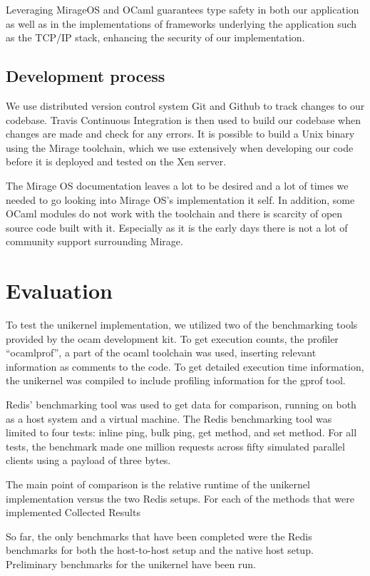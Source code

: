 \documentclass[english,10pt,twocolumn]{article}
\begin{document}
Leveraging MirageOS and OCaml guarantees type safety in both our application as well as in the implementations of frameworks underlying the application such as the TCP/IP stack, enhancing the security of our implementation.

\subsection{Development process}

We use distributed version control system Git and Github to track changes to our codebase.
Travis Continuous Integration is then used to build our codebase when changes are made and check for any errors.
It is possible to build a Unix binary using the Mirage toolchain, which we use extensively when developing our code before it is deployed and tested on the Xen server.

The Mirage OS documentation leaves a lot to be desired and a lot of times we needed to go looking into Mirage OS's implementation it self.
In addition, some OCaml modules do not work with the toolchain and there is scarcity of open source code built with it.
Especially as it is the early days there is not a lot of community support surrounding Mirage.


\section{Evaluation}


To test the unikernel implementation, we utilized two of the benchmarking tools provided by the  ocam development kit.
To get execution counts, the profiler “ocamlprof”, a part of the ocaml toolchain was used, inserting relevant information as comments to the code.
To get detailed execution time information, the unikernel was compiled to include profiling information for the gprof tool.

Redis' benchmarking tool was used to get data for comparison, running on both as a host system and a virtual machine.
The Redis benchmarking tool was limited to four tests: inline ping, bulk ping, get method, and set method.
For all tests, the benchmark made one million requests across fifty simulated parallel clients using a payload of three bytes.

The main point of comparison is the relative runtime of the unikernel implementation versus the two Redis setups.
For each of the methods that were implemented
Collected Results

So far, the only benchmarks that have been completed were the Redis benchmarks for both the host-to-host setup and the native host setup. Preliminary benchmarks for the unikernel have been run.
\end{document}
